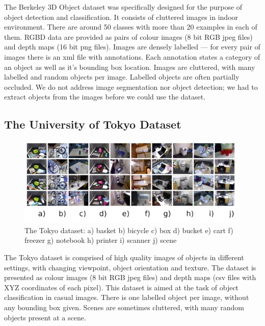 	The Berkeley 3D Object dataset was specifically designed for the purpose of object detection and classification. It consists of cluttered images in indoor environment. There are around 50 classes with more than 20 examples in each of them. RGBD data are provided as pairs of colour images (8 bit RGB jpeg files) and depth maps (16 bit png files). Images are densely labelled --- for every pair of images there is an xml file with annotations. Each annotation states a category of an object as well as it's bounding box location. Images are cluttered, with many labelled and random objects per image. Labelled objects are often partially occluded. We do not address image segmentation nor object detection; we had to extract objects from the images before we could use the dataset.

	\subsection{The University of Tokyo Dataset}	
	\begin{figure}[!ht]
	\centering
	\includegraphics[width=1\textwidth]{../figs/tokyo_horizontal}
	\caption{The Tokyo dataset: a) basket b) bicycle c) box d) bucket e) cart f) freezer g) notebook h) printer i) scanner j) scene}
	\label{fig:tokyo}
	\end{figure}
	
	The Tokyo dataset is comprised of high quality images of objects in different settings, with changing viewpoint, object orientation and texture. The dataset is presented as colour images (8 bit RGB jpeg files) and depth maps (csv files with XYZ coordinates of each pixel).	This dataset is aimed at the task of object classification in casual images. There is one labelled object per image, without any bounding box given. Scenes are sometimes cluttered, with many random objects present at a scene.